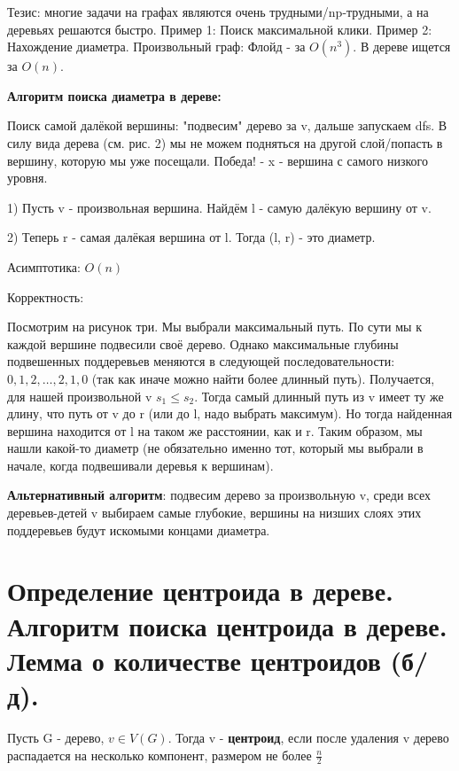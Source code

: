 Тезис: многие задачи на графах являются очень трудными/np-трудными, а на деревьях решаются быстро. Пример 1: Поиск максимальной клики. Пример 2: Нахождение диаметра. Произвольный граф: Флойд - за $O(n^3)$. В дереве ищется за $O(n)$.

\textbf{Алгоритм поиска диаметра в дереве:}

Поиск самой далёкой вершины: "подвесим" дерево за v, дальше запускаем dfs. В силу вида дерева (см. рис. 2) мы не можем подняться на другой слой/попасть в вершину, которую мы уже посещали. Победа! - x - вершина с самого низкого уровня.

1) Пусть v - произвольная вершина. Найдём l - самую далёкую вершину от v. 

2) Теперь r - самая далёкая вершина от l. Тогда (l, r) - это диаметр.

Асимптотика: $O(n)$

Корректность: 

Посмотрим на рисунок три. Мы выбрали максимальный путь. По сути мы к каждой вершине подвесили своё дерево. Однако максимальные глубины подвешенных поддеревьев меняются в следующей последовательности: $0, 1, 2, \dots, 2, 1, 0$ (так как иначе можно найти более длинный путь). Получается, для нашей произвольной v $s_1 \leqslant s_2$. Тогда самый длинный путь из v имеет ту же длину, что путь от v до r (или до l, надо выбрать максимум). Но тогда найденная вершина находится от l на таком же расстоянии, как и r. Таким образом, мы нашли какой-то диаметр (не обязательно именно тот, который мы выбрали в начале, когда подвешивали деревья к вершинам).

\textbf{Альтернативный алгоритм}: подвесим дерево за произвольную v, среди всех деревьев-детей v выбираем самые глубокие, вершины на низших слоях этих поддеревьев будут искомыми концами диаметра.

\newpage

\setcounter{section}{93}
\section{Определение центроида в дереве. Алгоритм поиска центроида в дереве. Лемма о количестве центроидов (б/д).}

Пусть G - дерево, $v \in V(G)$. Тогда v - \textbf{центроид}, если после удаления v дерево распадается на несколько компонент, размером не более $\frac{n}{2}$

